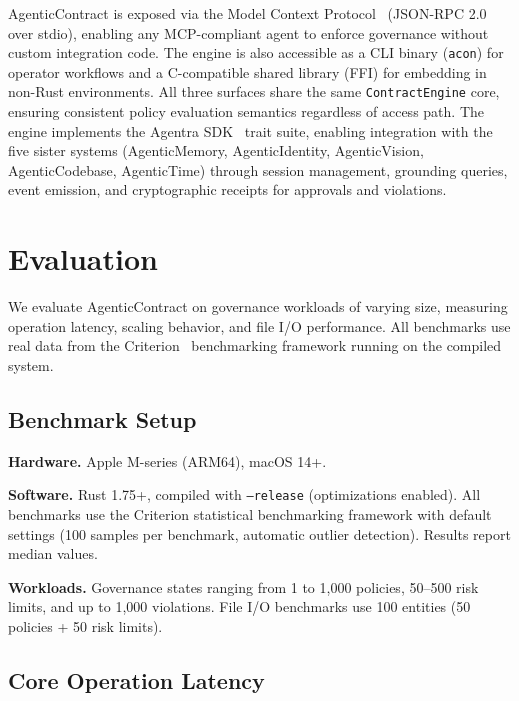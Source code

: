 \documentclass[10pt, twocolumn]{article}
\begin{document}
AgenticContract is exposed via the Model Context Protocol~\cite{mcp2024} (JSON-RPC 2.0 over stdio), enabling any MCP-compliant agent to enforce governance without custom integration code. The engine is also accessible as a CLI binary (\texttt{acon}) for operator workflows and a C-compatible shared library (FFI) for embedding in non-Rust environments. All three surfaces share the same \texttt{ContractEngine} core, ensuring consistent policy evaluation semantics regardless of access path. The engine implements the Agentra SDK~\cite{agentrasdk2026} trait suite, enabling integration with the five sister systems (AgenticMemory, AgenticIdentity, AgenticVision, AgenticCodebase, AgenticTime) through session management, grounding queries, event emission, and cryptographic receipts for approvals and violations.

\section{Evaluation}
\label{sec:evaluation}

We evaluate AgenticContract on governance workloads of varying size, measuring operation latency, scaling behavior, and file I/O performance. All benchmarks use real data from the Criterion~\cite{criterion} benchmarking framework running on the compiled system.

\subsection{Benchmark Setup}

\textbf{Hardware.} Apple M-series (ARM64), macOS 14+.

\textbf{Software.} Rust 1.75+, compiled with \texttt{--release} (optimizations enabled). All benchmarks use the Criterion statistical benchmarking framework with default settings (100 samples per benchmark, automatic outlier detection). Results report median values.

\textbf{Workloads.} Governance states ranging from 1 to 1{,}000 policies, 50--500 risk limits, and up to 1{,}000 violations. File I/O benchmarks use 100 entities (50 policies + 50 risk limits).

\subsection{Core Operation Latency}
\end{document}
